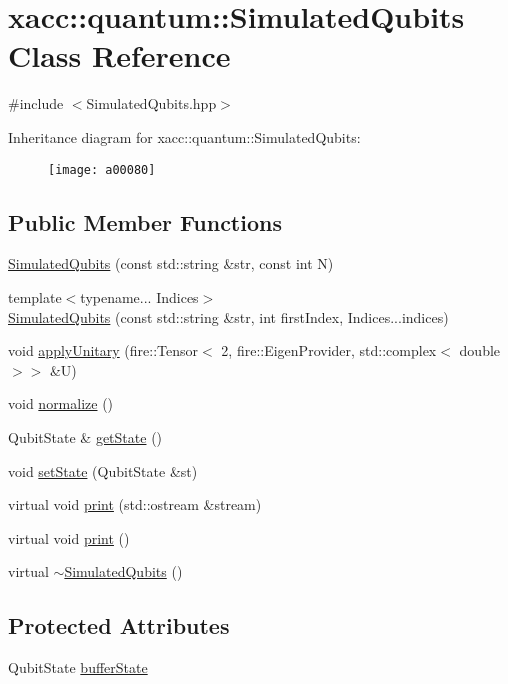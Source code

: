 \hypertarget{a00080}{}\section{xacc\+:\+:quantum\+:\+:Simulated\+Qubits Class Reference}
\label{a00080}


{\ttfamily \#include $<$Simulated\+Qubits.\+hpp$>$}

Inheritance diagram for xacc\+:\+:quantum\+:\+:Simulated\+Qubits\+:\begin{figure}[H]
\begin{center}
\leavevmode
\texttt{[image: a00080]}
\end{center}
\end{figure}
\subsection*{Public Member Functions}
\begin{DoxyCompactItemize}
\item 
\hyperlink{a00080_abb0419229628210a1c187b76be6edc30}{Simulated\+Qubits} (const std\+::string \&str, const int N)
\item 
{\footnotesize template$<$typename... Indices$>$ }\\\hyperlink{a00080_ae11d09c17316adb09b93cc866969dba8}{Simulated\+Qubits} (const std\+::string \&str, int first\+Index, Indices...\+indices)
\item 
void \hyperlink{a00080_a3f4518d0135101141bf92d7e31f4fddc}{apply\+Unitary} (fire\+::\+Tensor$<$ 2, fire\+::\+Eigen\+Provider, std\+::complex$<$ double $>$$>$ \&U)
\item 
void \hyperlink{a00080_a09ee499769bb1eedaf08d6b5c29f9791}{normalize} ()
\item 
Qubit\+State \& \hyperlink{a00080_a405577717ca200ed9e524c04209e0216}{get\+State} ()
\item 
void \hyperlink{a00080_a8cd74c239c1fcecb3d03d6989732d5fe}{set\+State} (Qubit\+State \&st)
\item 
virtual void \hyperlink{a00080_a9252d30be0563f36bf1ff839c7104cd7}{print} (std\+::ostream \&stream)
\item 
virtual void \hyperlink{a00080_a32922bd2ccc64bba601c07a3c136cc3d}{print} ()
\item 
virtual \hyperlink{a00080_aebf6f30a6d8c84971091d87908680e7e}{$\sim$\+Simulated\+Qubits} ()
\end{DoxyCompactItemize}
\subsection*{Protected Attributes}
\begin{DoxyCompactItemize}
\item 
Qubit\+State \hyperlink{a00080_a630bea50ee06fd59f74450f01f95e489}{buffer\+State}
\end{DoxyCompactItemize}


